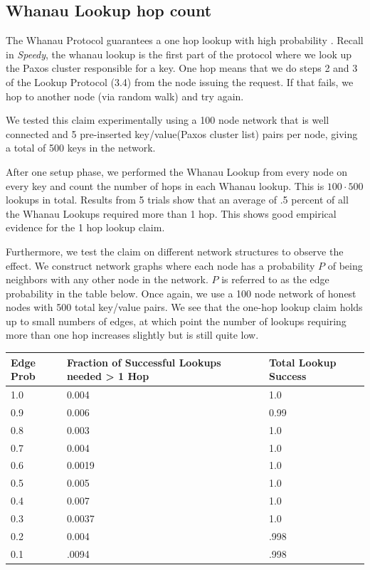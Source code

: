 \documentclass[letter]{article}
\newcommand{\sys}{\textit{Speedy}}
\begin{document}
\subsection{Whanau Lookup hop count}
The Whanau Protocol guarantees a one hop lookup with high probability \cite{whanau}. Recall in \sys{}, the whanau lookup is the first part of the protocol where we look up the Paxos cluster responsible for a key. One hop means that we do steps 2 and 3 of the Lookup Protocol (3.4) from the node issuing the request. If that fails, we hop to another node (via random walk) and try again.


We tested this claim experimentally using a 100 node network that is well connected and 5 pre-inserted key/value(Paxos cluster list) pairs per node, giving a total of 500 keys in the network.

After one setup phase, we performed the Whanau Lookup from every node on every key and count the number of hops in each Whanau lookup. This is $100 \cdot 500$ lookups in total. Results from 5 trials show that an average of .5 percent of all the Whanau Lookups required more than 1 hop. This shows good empirical evidence for the 1 hop lookup claim.

Furthermore, we test the claim on different network structures to observe the effect. We construct network graphs where each node has a probability $P$ of being neighbors with any other node in the network. $P$ is referred to as the edge probability in the table below. Once again, we use a 100 node network of honest nodes with 500 total key/value pairs. We see
that the one-hop lookup claim holds up to small numbers of
edges, at which point the number of lookups requiring more than one
hop increases slightly but is still quite low.\\

\begin{center}
\begin{tabular}{| l | l | l |}
\hline
Edge Prob & Fraction of Successful Lookups needed > 1 Hop & Total Lookup Success\\ \hline
1.0 & 0.004 & 1.0\\ \hline
0.9 & 0.006 & 0.99\\ \hline
0.8 & 0.003 & 1.0\\ \hline
0.7 & 0.004 & 1.0\\ \hline
0.6 & 0.0019 & 1.0\\ \hline
0.5 & 0.005 & 1.0\\ \hline
0.4 & 0.007 & 1.0\\ \hline
0.3 & 0.0037 & 1.0\\ \hline
0.2 & 0.004 & .998\\ \hline
0.1 & .0094 & .998\\ \hline
\end{tabular}
\end{center}
\end{document}
